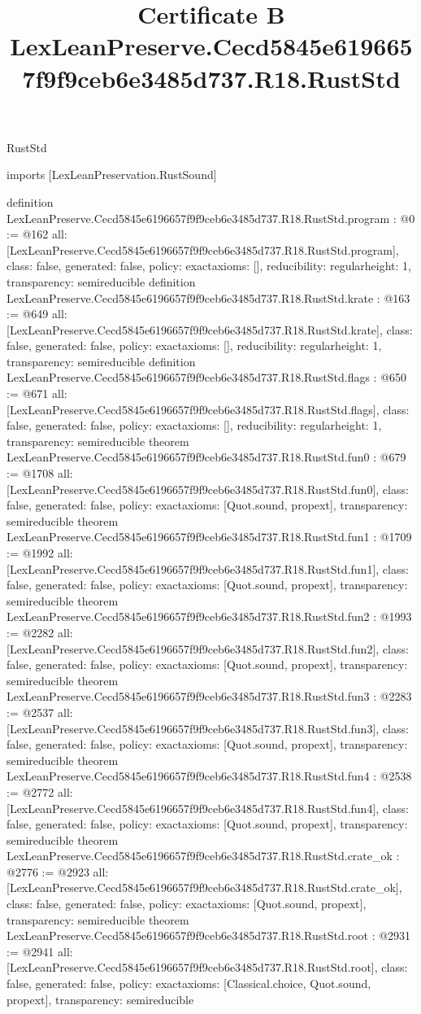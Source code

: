 \begin{lexlean}{RustStd}
\title{Certificate B LexLeanPreserve.Cecd5845e6196657f9f9ceb6e3485d737.R18.RustStd}
\begin{coremodule}
imports [LexLeanPreservation.RustSound]

definition LexLeanPreserve.Cecd5845e6196657f9f9ceb6e3485d737.R18.RustStd.program : @0 := @162 {
  all: [LexLeanPreserve.Cecd5845e6196657f9f9ceb6e3485d737.R18.RustStd.program],
  class: false,
  generated: false,
  policy: exact{axioms: []},
  reducibility: regular{height: 1},
  transparency: semireducible
}
definition LexLeanPreserve.Cecd5845e6196657f9f9ceb6e3485d737.R18.RustStd.krate : @163 := @649 {
  all: [LexLeanPreserve.Cecd5845e6196657f9f9ceb6e3485d737.R18.RustStd.krate],
  class: false,
  generated: false,
  policy: exact{axioms: []},
  reducibility: regular{height: 1},
  transparency: semireducible
}
definition LexLeanPreserve.Cecd5845e6196657f9f9ceb6e3485d737.R18.RustStd.flags : @650 := @671 {
  all: [LexLeanPreserve.Cecd5845e6196657f9f9ceb6e3485d737.R18.RustStd.flags],
  class: false,
  generated: false,
  policy: exact{axioms: []},
  reducibility: regular{height: 1},
  transparency: semireducible
}
theorem LexLeanPreserve.Cecd5845e6196657f9f9ceb6e3485d737.R18.RustStd.fun0 : @679 := @1708 {
  all: [LexLeanPreserve.Cecd5845e6196657f9f9ceb6e3485d737.R18.RustStd.fun0],
  class: false,
  generated: false,
  policy: exact{axioms: [Quot.sound, propext]},
  transparency: semireducible
}
theorem LexLeanPreserve.Cecd5845e6196657f9f9ceb6e3485d737.R18.RustStd.fun1 : @1709 := @1992 {
  all: [LexLeanPreserve.Cecd5845e6196657f9f9ceb6e3485d737.R18.RustStd.fun1],
  class: false,
  generated: false,
  policy: exact{axioms: [Quot.sound, propext]},
  transparency: semireducible
}
theorem LexLeanPreserve.Cecd5845e6196657f9f9ceb6e3485d737.R18.RustStd.fun2 : @1993 := @2282 {
  all: [LexLeanPreserve.Cecd5845e6196657f9f9ceb6e3485d737.R18.RustStd.fun2],
  class: false,
  generated: false,
  policy: exact{axioms: [Quot.sound, propext]},
  transparency: semireducible
}
theorem LexLeanPreserve.Cecd5845e6196657f9f9ceb6e3485d737.R18.RustStd.fun3 : @2283 := @2537 {
  all: [LexLeanPreserve.Cecd5845e6196657f9f9ceb6e3485d737.R18.RustStd.fun3],
  class: false,
  generated: false,
  policy: exact{axioms: [Quot.sound, propext]},
  transparency: semireducible
}
theorem LexLeanPreserve.Cecd5845e6196657f9f9ceb6e3485d737.R18.RustStd.fun4 : @2538 := @2772 {
  all: [LexLeanPreserve.Cecd5845e6196657f9f9ceb6e3485d737.R18.RustStd.fun4],
  class: false,
  generated: false,
  policy: exact{axioms: [Quot.sound, propext]},
  transparency: semireducible
}
theorem LexLeanPreserve.Cecd5845e6196657f9f9ceb6e3485d737.R18.RustStd.crate_ok : @2776 := @2923 {
  all: [LexLeanPreserve.Cecd5845e6196657f9f9ceb6e3485d737.R18.RustStd.crate_ok],
  class: false,
  generated: false,
  policy: exact{axioms: [Quot.sound, propext]},
  transparency: semireducible
}
theorem LexLeanPreserve.Cecd5845e6196657f9f9ceb6e3485d737.R18.RustStd.root : @2931 := @2941 {
  all: [LexLeanPreserve.Cecd5845e6196657f9f9ceb6e3485d737.R18.RustStd.root],
  class: false,
  generated: false,
  policy: exact{axioms: [Classical.choice, Quot.sound, propext]},
  transparency: semireducible
}


\end{coremodule}
\end{lexlean}
